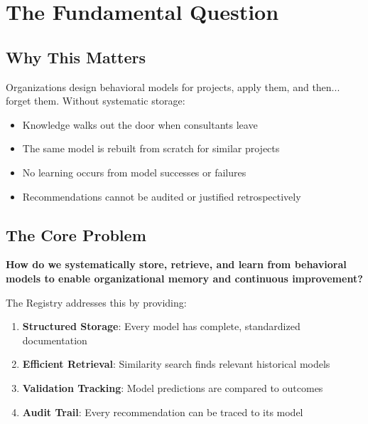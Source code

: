 
\section{The Fundamental Question}
\label{sec:fff-fundamental}

\subsection{Why This Matters}

Organizations design behavioral models for projects, apply them, and then...
forget them. Without systematic storage:

\begin{itemize}
\item Knowledge walks out the door when consultants leave
\item The same model is rebuilt from scratch for similar projects
\item No learning occurs from model successes or failures
\item Recommendations cannot be audited or justified retrospectively
\end{itemize}

\subsection{The Core Problem}

\begin{tcolorbox}[colback=red!5!white, colframe=red!75!black,
    title=The Fundamental Question]
\textbf{How do we systematically store, retrieve, and learn from behavioral
models to enable organizational memory and continuous improvement?}
\end{tcolorbox}

The Registry addresses this by providing:
\begin{enumerate}
\item \textbf{Structured Storage}: Every model has complete, standardized documentation
\item \textbf{Efficient Retrieval}: Similarity search finds relevant historical models
\item \textbf{Validation Tracking}: Model predictions are compared to outcomes
\item \textbf{Audit Trail}: Every recommendation can be traced to its model
\end{enumerate}


